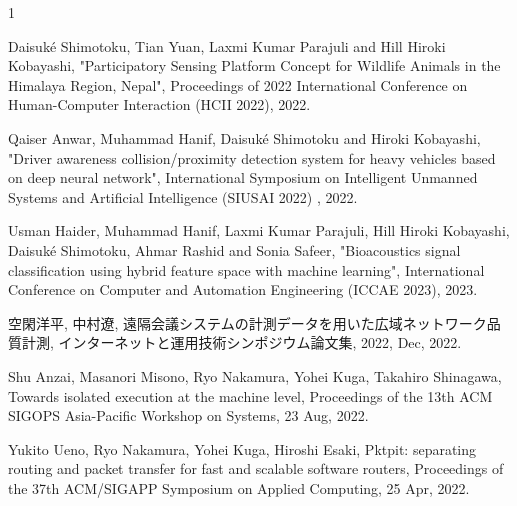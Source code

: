 \begin{査読付}{1}

Daisuk\'e Shimotoku, Tian Yuan, Laxmi Kumar Parajuli and Hill Hiroki Kobayashi, "Participatory Sensing Platform Concept for Wildlife Animals in the Himalaya Region, Nepal", Proceedings of 2022 International Conference on Human-Computer Interaction (HCII 2022), 2022.  

Qaiser Anwar, Muhammad Hanif, Daisuk\'e Shimotoku and  Hiroki Kobayashi, "Driver awareness collision/proximity detection system for heavy vehicles based on deep neural network", International Symposium on Intelligent Unmanned Systems and Artificial Intelligence (SIUSAI 2022) , 2022.  

Usman Haider, Muhammad Hanif, Laxmi Kumar Parajuli, Hill Hiroki Kobayashi, Daisuk\'e Shimotoku, Ahmar Rashid and Sonia Safeer, "Bioacoustics signal classification using hybrid feature space with machine learning",  International Conference on Computer and Automation Engineering (ICCAE 2023), 2023.  

空閑洋平, 中村遼, 遠隔会議システムの計測データを用いた広域ネットワーク品質計測, インターネットと運用技術シンポジウム論文集, 2022, Dec, 2022.

Shu Anzai, Masanori Misono, Ryo Nakamura, Yohei Kuga, Takahiro Shinagawa, Towards isolated execution at the machine level, Proceedings of the 13th ACM SIGOPS Asia-Pacific Workshop on Systems, 23 Aug, 2022.

Yukito Ueno, Ryo Nakamura, Yohei Kuga, Hiroshi Esaki, Pktpit: separating routing and packet transfer for fast and scalable software routers, Proceedings of the 37th ACM/SIGAPP Symposium on Applied Computing, 25 Apr, 2022.


\end{査読付}
